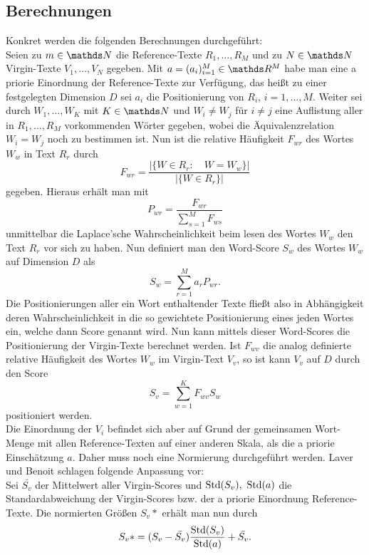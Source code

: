 \subsection{Berechnungen} \label{Berechnungen}

Konkret werden die folgenden Berechnungen durchgeführt: \\
Seien zu $m\in\N$ die Reference-Texte  $R_1,\ldots,R_M$ und zu $N\in\N$ Virgin-Texte $V_1,\ldots,V_N$ gegeben. 
Mit $a=(a_i)_{i=1}^M\in\R^M$ habe man eine a priorie Einordnung der Reference-Texte zur Verfügung, 
das heißt zu einer festgelegten Dimension $D$ sei $a_i$ die Positionierung von $R_i$, $i=1,\ldots,M$. 
Weiter sei durch $W_1,\ldots,W_K$ mit $K\in\N$ und $W_i\neq W_j$ für $i\neq j$ 
eine Auflistung aller in $R_1,\ldots,R_M$ vorkommenden Wörter gegeben, 
wobei die Äquivalenzrelation $W_i = W_j$ noch zu bestimmen ist. 
Nun ist die relative Häufigkeit $F_{wr}$ des Wortes $W_w$ in Text $R_r$ durch
\begin{displaymath}
F_{wr} = \frac{|\{W\in R_r:\quad W=W_w  \}|}{|\{W\in R_r\}|}
\end{displaymath}
gegeben. Hieraus erhält man mit
\begin{displaymath}
P_{wr} = \frac{F_{wr}}{\sum_{s=1}^M F_{ws}}
\end{displaymath}
unmittelbar die Laplace'sche Wahrscheinlichkeit beim lesen des Wortes $W_w$ den Text $R_r$ vor sich zu haben. Nun definiert man den Word-Score $S_{w}$ des Wortes $W_w$ auf Dimension $D$ als
\begin{displaymath}
S_w = \sum_{r=1}^M a_r P_{wr}.
\end{displaymath}
Die Positionierungen aller ein Wort enthaltender Texte fließt also in Abhängigkeit deren Wahrscheinlichkeit in die so gewichtete Positionierung eines jeden Wortes ein, welche dann Score genannt wird. Nun kann mittels dieser Word-Scores die Positionierung der Virgin-Texte berechnet werden. Ist $F_{wv}$ die analog definierte relative Häufigkeit des Wortes $W_w$ im Virgin-Text $V_v$, so ist kann $V_v$ auf $D$ durch den Score
\begin{displaymath}
S_v = \sum_{w=1}^K F_{wv} S_w
\end{displaymath}
positioniert werden. \\
Die Einordnung der $V_i$ befindet sich aber auf Grund der gemeinsamen Wort-Menge mit allen Reference-Texten auf einer anderen Skala, als die a priorie Einschätzung $a$. 
Daher muss noch eine Normierung durchgeführt werden. Laver und Benoit schlagen folgende Anpassung vor: \\
Sei $\bar{S_v}$ der Mittelwert aller Virgin-Scores und $\operatorname{Std}(S_v),~\operatorname{Std}(a)$ die Standardabweichung der Virgin-Scores bzw. der a priorie Einordnung Reference-Texte. Die normierten Größen $S_v*$ erhält man nun durch
\begin{displaymath}
S_v* = (S_v - \bar{S_v}) \frac{\operatorname{Std}(S_v)}{\operatorname{Std}(a)} +\bar{S_v}. 
\end{displaymath}   
  
